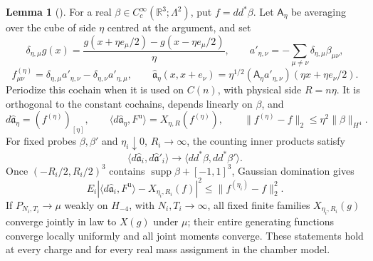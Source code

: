 \documentclass[11pt,letterpaper,reqno]{amsart}
\theoremstyle{definition}
\newtheorem{qcmlemma}[qcmproposition]{Lemma}
\newenvironment{lemma}[1][]{\pushQED{\qed}\renewcommand{\qedsymbol}{$\blacksquare$}\begin{qcmlemma}[#1]}{\popQED\end{qcmlemma}}
\begin{document}
\begin{lemma}\label{qcm:lattice-probes}
For a real $\beta\in C_c^\infty(\mathbb R^3;\Lambda^2)$, put
$f=dd^*\beta$. Let $\mathsf A_\eta$ be averaging over the cube of side
$\eta$ centred at the argument, and set
\[
 \delta_{\eta,\mu}g(x)
  =\frac{g(x+\eta e_\mu/2)-g(x-\eta e_\mu/2)}{\eta},\qquad
 a'_{\eta,\nu}=-\sum_{\mu\ne\nu}\delta_{\eta,\mu}\beta_{\mu\nu},
\]
\[
 f^{(\eta)}_{\mu\nu}
  =\delta_{\eta,\mu}a'_{\eta,\nu}
                     -\delta_{\eta,\nu}a'_{\eta,\mu},\qquad
 \widehat{\mathfrak a}_\eta(x,x+e_\nu)
  =\eta^{1/2}(\mathsf A_\eta a'_{\eta,\nu})(\eta x+\eta e_\nu/2).
\]
Periodize this cochain when it is used on $C(n)$, with physical
side $R=n\eta$. It is orthogonal to the constant cochains, depends
linearly on $\beta$, and
\begin{equation}\label{qcm:lattice-probe-identity}
 d\widehat{\mathfrak a}_\eta=(f^{(\eta)})_{[\eta]},\qquad
 \langle d\widehat{\mathfrak a}_\eta,F^{\mathrm u}\rangle
       =X_{\eta,R}(f^{(\eta)}),\qquad
 \|f^{(\eta)}-f\|_2\le\eta^2\|\beta\|_{H^4}.
\end{equation}
For fixed probes $\beta,\beta'$ and $\eta_i\downarrow0$,
$R_i\to\infty$, the counting inner products satisfy
\[
 \langle d\widehat{\mathfrak a}_i,
                 d\widehat{\mathfrak a}'_i\rangle\longrightarrow
                         \langle dd^*\beta,dd^*\beta'\rangle.
\]
Once $(-R_i/2,R_i/2)^3$ contains
$\operatorname{supp}\beta+[-1,1]^3$, Gaussian domination gives
\begin{equation}\label{qcm:lattice-probe-replacement}
 E_i\left|\langle d\widehat{\mathfrak a}_i,F^{\mathrm u}\rangle
                  -X_{\eta_i,R_i}(f)\right|^2
                       \le\|f^{(\eta_i)}-f\|_2^2.
\end{equation}
If $P_{N_i,T_i}\to\mu$ weakly on $H_{-4}$, with
$N_i,T_i\to\infty$, all fixed finite families
$X_{\eta_i,R_i}(g)$ converge jointly in law to $X(g)$ under $\mu$;
their entire generating functions converge locally uniformly and
all joint moments converge. These statements hold at every charge
and for every real mass assignment in the chamber model.
\end{lemma}
\end{document}
